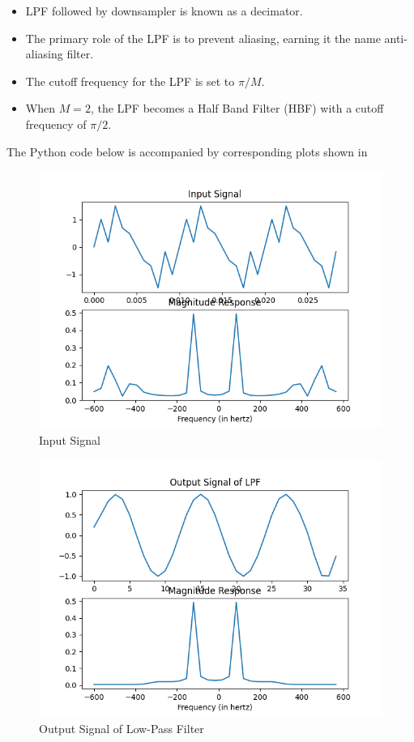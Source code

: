 \documentclass{article}
\begin{document}
\begin{itemize}
    \item LPF followed by downsampler is known as a decimator.
    \item The primary role of the LPF is to prevent aliasing, earning it the name anti-aliasing filter.
    \item The cutoff frequency for the LPF is set to \(\pi/M\).
    \item When \(M = 2\), the LPF becomes a Half Band Filter (HBF) with a cutoff frequency of \(\pi/2\).
\end{itemize}
The Python code below is accompanied by corresponding plots shown in
\begin{center}
\end{center}

\begin{figure}[ht]
  \centering
  \includegraphics[scale=0.5]{../figs/d_input.png}
  \caption{ Input Signal}
  \label{fig:d_input}
\end{figure}

\begin{figure}[ht]
  \centering
  \includegraphics[scale=0.5]{../figs/d_l_out.png}
  \caption{Output Signal of Low-Pass Filter}
  \label{fig:d_l_out}
\end{figure}
\end{document}
